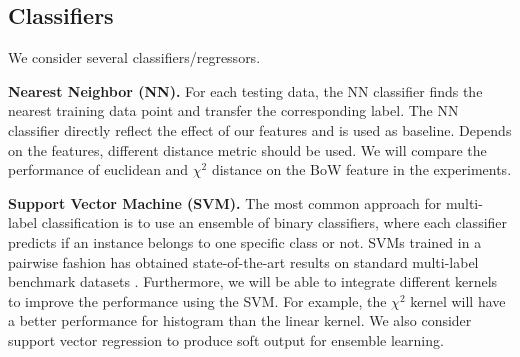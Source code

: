 \documentclass[12pt,peerreview,letterpaper]{IEEEtran}
\begin{document}

\subsection{Classifiers}
We consider several classifiers/regressors.

\textbf{Nearest Neighbor (NN).} For each testing data, the NN classifier finds the nearest training data point and transfer the corresponding label. The NN classifier directly reflect the effect of our features and is used as baseline. Depends on the features, different distance metric should be used. We will compare the performance of euclidean and $\chi^2$ distance on the BoW feature in the experiments.

\textbf{Support Vector Machine (SVM).} The most common approach for multi-label classification is to use an ensemble of binary classifiers, where each classifier predicts if an instance belongs to
one specific class or not. SVMs trained in a pairwise fashion has obtained state-of-the-art results on standard multi-label benchmark datasets \cite{Mencia_NIPSW13}. Furthermore, we will be able to integrate different kernels to improve the performance using the SVM. For example, the $\chi^2$ kernel will have a better performance for histogram than the linear kernel. We also consider support vector regression to produce soft output for ensemble learning.
\end{document}
